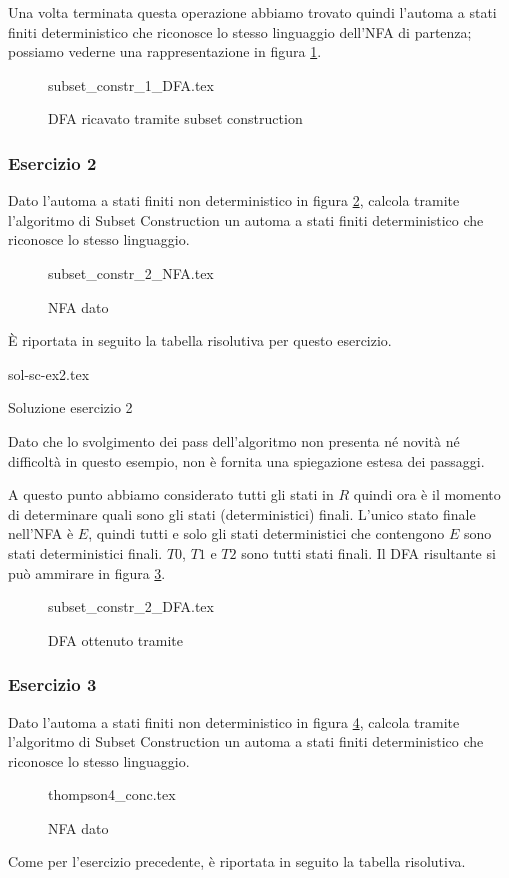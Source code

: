 \documentclass[class=book, crop=false, oneside, 12pt]{standalone}
\begin{document}
Una volta terminata questa operazione abbiamo trovato quindi l’automa a stati finiti deterministico che riconosce lo stesso linguaggio dell’NFA di partenza; possiamo vederne una rappresentazione in figura \ref{sol_sc_1}.
\begin{figure}[H]
    \centering
    {subset_constr_1_DFA.tex}
    \caption{DFA ricavato tramite subset construction}
    \label{sol_sc_1}
\end{figure}


\subsubsection*{Esercizio 2}
Dato l'automa a stati finiti non deterministico in figura \ref{es_sc_2}, calcola tramite l'algoritmo di Subset Construction un automa a stati finiti deterministico che riconosce lo stesso linguaggio.
\begin{figure}[H]
    \centering
    {subset_constr_2_NFA.tex}
    \caption{NFA dato}
    \label{es_sc_2}
\end{figure}
È riportata in seguito la tabella risolutiva per questo esercizio.\\

\begin{table}[H]
	\centering
	{sol-sc-ex2.tex}
    \caption{Soluzione esercizio 2}
    \label{sol-sc-ex2}
\end{table} 

Dato che lo svolgimento dei pass dell'algoritmo non presenta né novità né difficoltà in questo esempio, non è fornita una spiegazione estesa dei passaggi.

A questo punto abbiamo considerato tutti gli stati in \(R\) quindi ora è il momento di determinare quali sono gli stati (deterministici) finali. L’unico stato finale nell'NFA è \(E\), quindi tutti e solo gli stati deterministici che contengono \(E\) sono stati deterministici finali. \(T0\), \(T1\) e \(T2\) sono tutti stati finali. Il DFA risultante si può ammirare in figura \ref{sol_sc_2}.
\begin{figure}[H]
    \centering
    {subset_constr_2_DFA.tex}
    \caption{DFA ottenuto tramite}
    \label{sol_sc_2}
\end{figure}

\subsubsection*{Esercizio 3}
Dato l'automa a stati finiti non deterministico in figura \ref{es_sc_3}, calcola tramite l'algoritmo di Subset Construction un automa a stati finiti deterministico che riconosce lo stesso linguaggio.
\begin{figure}[H]
    \centering
    {thompson4_conc.tex}
    \caption{NFA dato}
    \label{es_sc_3}
\end{figure}
Come per l'esercizio precedente, è riportata in seguito la tabella risolutiva.\\
\end{document}
